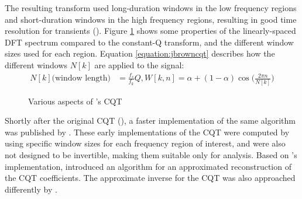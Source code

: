 \documentclass[report.tex]{subfiles}
\begin{document}
The resulting transform used long-duration windows in the low frequency regions and short-duration windows in the high frequency regions, resulting in good time resolution for transients (\cite{cqtransient}). Figure \ref{fig:jbrowncqt} shows some properties of the linearly-spaced DFT spectrum compared to the constant-Q transform, and the different window sizes used for each region. Equation \ref{equation:jbrowncqt} describes how the different windows $N[k]$ are applied to the signal:
\begin{align}\tag{9}\label{equation:jbrowncqt}
	\nonumber N[k] \text{(window length)} &= \frac{f_{s}}{f_{k}}Q, W[k, n] = \alpha + (1 - \alpha)\cos\big(\frac{2\pi n}{N[k]}\big)
\end{align}

\begin{figure}[ht]
	\centering
	\hspace{0.5em}
	\caption{Various aspects of \textcite{jbrown}'s CQT}
	\label{fig:jbrowncqt}
\end{figure}

Shortly after the original CQT (\cite{jbrown}), a faster implementation of the same algorithm was published by \textcite{msp}. These early implementations of the CQT were computed by using specific window sizes for each frequency region of interest, and were also not designed to be invertible, making them suitable only for analysis. Based on \textcite{msp}'s implementation, \textcite{klapuricqt} introduced an algorithm for an approximated reconstruction of the CQT coefficients. The approximate inverse for the CQT was also approached differently by \textcite{fitzgeraldcqt}.
\end{document}
